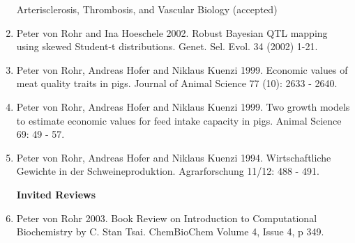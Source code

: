 \documentclass[11pt,a4paper]{scrartcl}
\begin{document}
\begin{enumerate}
  Arterisclerosis, Thrombosis, and Vascular Biology (accepted) 
\item Peter von Rohr  and Ina Hoeschele 2002. Robust Bayesian QTL mapping using skewed Student-t distributions. Genet. Sel. Evol. 34 (2002) 1-21. 
\item Peter von Rohr, Andreas Hofer and Niklaus Kuenzi 1999. Economic values of meat quality traits in pigs. Journal of Animal Science 77 (10): 2633 - 2640.
\item Peter von Rohr, Andreas Hofer and Niklaus Kuenzi 1999. Two growth models to estimate economic values for feed intake capacity in pigs. Animal Science 69: 49 - 57.
\item Peter von Rohr, Andreas Hofer and Niklaus Kuenzi 1994. Wirtschaftliche Gewichte in der Schweineproduktion. Agrarforschung 11/12: 488 - 491.


\vspace{2ex}
\noindent\textbf{Invited Reviews}
\item Peter von Rohr 2003. Book Review on Introduction to Computational Biochemistry 
  by C. Stan Tsai. ChemBioChem Volume 4, Issue 4, p 349.


\end{enumerate}
\end{document}

